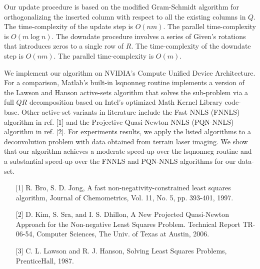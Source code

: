 \documentclass{report}
\begin{document}
Our update procedure is based on the modified Gram-Schmidt algorithm for
orthogonalizing the inserted column with respect to all the existing
columns in $Q$. The time-complexity of the update step is $O(nm)$. The
parallel time-complexity is $O(m\log{n})$. The downdate procedure
involves a series of Given's rotations that introduces zeros to a single
row of $R$. The time-complexity of the downdate step is $O(nm)$. The
parallel time-complexity is $O(m)$.

We implement our algorithm on NVIDIA's Compute Unified Device
Architecture. For a comparison, Matlab's built-in lsqnonneg routine
implements a version of the Lawson and Hanson active-sets algorithm that
solves the sub-problem via a full $QR$ decomposition based on Intel's
optimized Math Kernel Library code-base. Other active-set variants in
literature include the Fast NNLS (FNNLS) algorithm in ref. [1] and the
Projective Quasi-Newton NNLS (PQN-NNLS) algorithm in ref. [2]. For
experiments results, we apply the listed algorithms to a deconvolution
problem with data obtained from terrain laser imaging. We show that our
algorithm achieves a moderate speed-up over the lsqnonneg routine and a
substantial speed-up over the FNNLS and PQN-NNLS algorithms for our
data-set.

\vspace{1cm}

{}
\vspace{.5cm}
\begin{enumerate}
\item[{[1]}] R. Bro, S. D. Jong, A fast non-negativity-constrained least
squares algorithm, Journal of Chemometrics, Vol. 11, No. 5, pp. 393-401,
1997.

\item[{[2]}] D. Kim, S. Sra, and I. S. Dhillon, A New Projected
Quasi-Newton Approach for the Non-negative Least Squares Problem.
Technical Report TR-06-54, Computer Sciences, The Univ. of Texas at
Austin, 2006.

\item[{[3]}] C. L. Lawson and R. J. Hanson, Solving Least Squares
Problems, PrenticeHall, 1987.
\end{enumerate}
\end{document}
